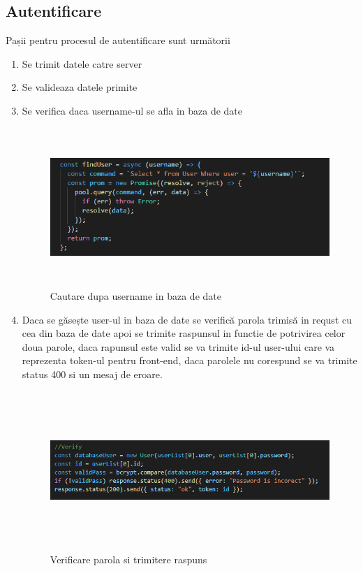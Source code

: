 \subsection{Autentificare}
\par Pașii pentru procesul de autentificare sunt următorii
\begin{enumerate}
  	\item Se trimit datele catre server
  	\item Se valideaza datele primite
  	\item Se verifica daca username-ul se afla in baza de date 
		\begin{figure}[htbp]
			\centerline{\includegraphics[width=19cm, height=6cm]{figures/cautare user.png}}
			\caption{Cautare dupa username in baza de date}
			\label{fig}
		\end{figure}	
	\item Daca se găsește user-ul in baza de date se verifică parola trimisă in requst cu cea din baza de date apoi se trimite raspunsul in functie de potrivirea celor doua parole, daca rapunsul este valid se va trimite id-ul user-ului care va reprezenta token-ul pentru front-end, daca  parolele nu corespund se va trimite status 400 si un mesaj de eroare.
		\begin{figure}[htbp]
			\centerline{\includegraphics[width=19cm, height=6cm]{figures/verificare login.png}}
			\caption{Verificare parola si trimitere raspuns}
			\label{fig}
		\end{figure}	
\end{enumerate}